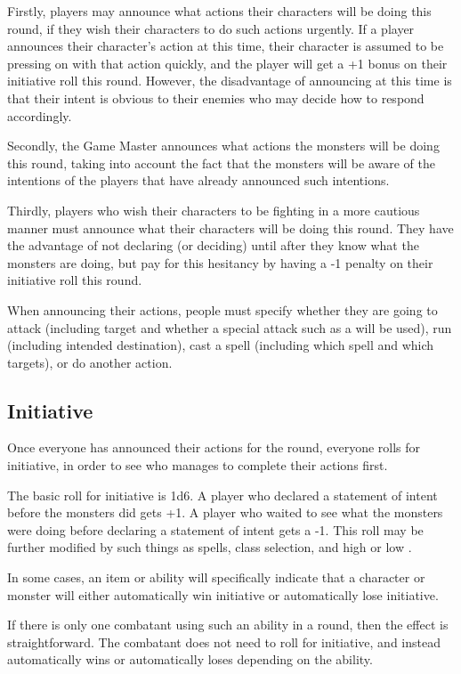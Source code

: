 \begin{multicols*}{2}
Firstly, players may announce what actions their characters will be doing this round, if they wish their characters to do such actions urgently. If a player announces their character’s action at this time, their character is assumed to be pressing on with that action quickly, and the player will get a +1 bonus on their initiative roll this round. However, the disadvantage of announcing at this time is that their intent is obvious to their enemies who may decide how to respond accordingly.

Secondly, the Game Master announces what actions the monsters will be doing this round, taking into account the fact that the monsters will be aware of the intentions of the players that have already announced such intentions.

Thirdly, players who wish their characters to be fighting in a more cautious manner must announce what their characters will be doing this round. They have the advantage of not declaring (or deciding) until after they know what the monsters are doing, but pay for this hesitancy by having a -1 penalty on their initiative roll this round.

When announcing their actions, people must specify whether they are going to attack (including target and whether a special attack such as a  will be used), run (including intended destination), cast a spell (including which spell and which targets), or do another action.

\subsection{Initiative}
Once everyone has announced their actions for the round, everyone rolls for initiative, in order to see who manages to complete their actions first.

The basic roll for initiative is 1d6. A player who declared a statement of intent before the monsters did gets +1. A player who waited to see what the monsters were doing before declaring a statement of intent gets a -1. This roll may be further modified by such things as spells, class selection, and high or low .

In some cases, an item or ability will specifically indicate that a character or monster will either automatically win initiative or automatically lose initiative.

If there is only one combatant using such an ability in a round, then the effect is straightforward. The combatant does not need to roll for initiative, and instead automatically wins or automatically loses depending on the ability.


\end{multicols*}
